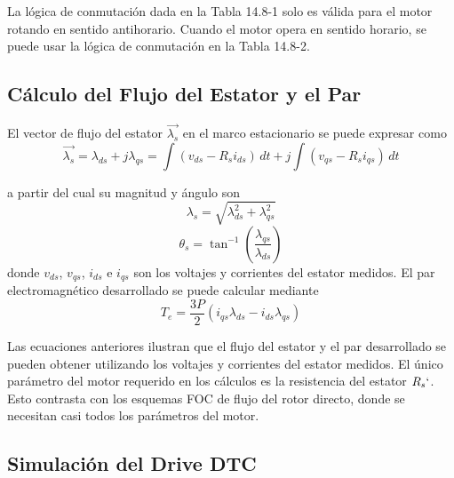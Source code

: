 \documentclass[letterpaper,12pt]{article}
\begin{document}
La lógica de conmutación dada en la Tabla 14.8-1 solo es válida para el motor rotando en sentido antihorario. Cuando el motor opera en sentido horario, se puede usar la lógica de conmutación en la Tabla 14.8-2.

\clearpage
\subsection{Cálculo del Flujo del Estator y el Par}

El vector de flujo del estator $\vec{\lambda_s}$ en el marco estacionario se puede expresar como
\begin{equation}
    \vec{\lambda_s} = \lambda_{ds} + j\lambda_{qs} = \int (v_{ds} - R_s i_{ds}) \, dt + j \int (v_{qs} - R_s i_{qs}) \, dt \tag{14.8-3}
\end{equation}

a partir del cual su magnitud y ángulo son
\begin{equation}
    \lambda_s = \sqrt{\lambda_{ds}^2 + \lambda_{qs}^2} \tag{14.8-4}
\end{equation}
\begin{equation}
    \theta_s = \tan^{-1} \left( \frac{\lambda_{qs}}{\lambda_{ds}} \right) \tag{14.8-5}
\end{equation}
donde $v_{ds}$, $v_{qs}$, $i_{ds}$ e $i_{qs}$ son los voltajes y corrientes del estator medidos. El par electromagnético desarrollado se puede calcular mediante
\begin{equation}
    T_e = \frac{3P}{2} \left( i_{qs} \lambda_{ds} - i_{ds} \lambda_{qs} \right) \tag{14.8-6}
\end{equation}

Las ecuaciones anteriores ilustran que el flujo del estator y el par desarrollado se pueden obtener utilizando los voltajes y corrientes del estator medidos. El único parámetro del motor requerido en los cálculos es la resistencia del estator $R_s`$. Esto contrasta con los esquemas FOC de flujo del rotor directo, donde se necesitan casi todos los parámetros del motor.

\clearpage
\subsection{Simulación del Drive DTC}
\end{document}
